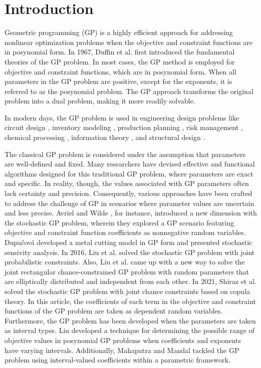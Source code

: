 \section{Introduction}\label{sec.1}
Geometric programming (GP) is a highly efficient approach for addressing nonlinear optimization problems when the objective and constraint functions are in posynomial form. In 1967, Duffin et al. \cite{Duffin 1967} first introduced the fundamental theories of the GP problem. In most cases, the GP method is employed for objective and constraint functions, which are in posynomial form. When all parameters in the GP problem are positive, except for the exponents, it is referred to as the posynomial problem. The GP approach transforms the original problem into a dual problem, making it more readily solvable.
\par In modern days, the GP problem is used in engineering design problems like circuit design \cite{Chu 2001,Hershenson 2001}, inventory modeling \cite{Mandal 2006,Roy 1997,Worrall 1982}, production planning \cite{Cheng 1991,Choi 1996,Islam 2007,Jung 2001,Kim 1998,Lee 1993}, risk management \cite{Scott 1995}, chemical processing \cite{Passy 1968,Ruckaert 1978,Wall 1986}, information theory \cite{Chiang 2005}, and structural design \cite{Gupta 1986}.
\par The classical GP problem is considered under the assumption that parameters are well-defined and fixed. Many researchers \cite{Avriel 1975,Beightler 1976,Duffin 1967,Duffin 1973,Fang 1988,Kortanek 1992,Kortanek 1997,Maranas 1997,Rajgopal 1990,Rajgopal 1992,Rajgopal 2002} have devised effective and functional algorithms designed for this traditional GP problem, where parameters are exact and specific. In reality, though, the values associated with GP parameters often lack certainty and precision. Consequently, various approaches have been crafted to address the challenge of GP in scenarios where parameter values are uncertain and less precise. Avriel and Wilde \cite{Avriel 1969}, for instance, introduced a new dimension with the stochastic GP problem, wherein they explored a GP scenario featuring objective and constraint function coefficients as nonnegative random variables. Dupačová \cite{Dupačová 2010} developed a metal cutting model in GP form and presented stochastic sensivity analysis. In 2016, Liu et al. \cite{Liu 2016} solved the stochastic GP problem with joint probabilistic constraints. Also, Liu et al. \cite{Liu 2020} came up with a new way to solve the joint rectangular chance-constrained GP problem with random parameters that are elliptically distributed and independent from each other. In 2021, Shiraz et al. \cite{Shiraz 2021} solved the stochastic GP problem with joint chance constraints based on copula theory. In this article, the coefficients of each term in the objective and constraint functions of the GP problem are taken as dependent random variables. Furthermore, the GP problem has been developed when the parameters are taken as interval types. Liu \cite{Liu 2006} developed a technique for determining the possible range of objective values in posynomial GP problems when coefficients and exponents have varying intervals. Additionally, Mahapatra and Mandal \cite{Mahapatra 2012} tackled the GP problem using interval-valued coefficients within a parametric framework.
